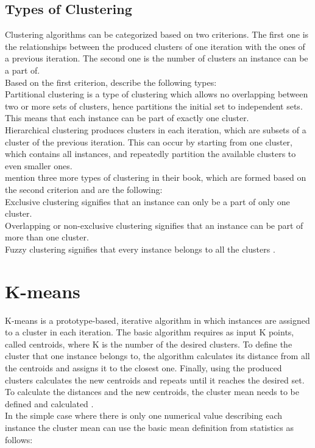 \subsection{Types of Clustering}
Clustering algorithms can be categorized based on two criterions. The first one is the relationships between the produced clusters of one iteration with the ones of a previous iteration. The second one is the number of clusters an instance can be a part of. \\
Based on the first criterion, \textcite{tanSteinKum} describe the following types: \\
Partitional clustering is a type of clustering which allows no overlapping between two or more sets of clusters, hence partitions the initial set to independent sets. This means that each instance can be part of exactly one cluster. \\
Hierarchical clustering produces clusters in each iteration, which are subsets of a cluster of the previous iteration. This can occur by starting from one cluster, which contains all instances, and repeatedly partition the available clusters to even smaller ones. \\
\textcite{tanSteinKum} mention three more types of clustering in their book, which are formed based on the second criterion and are the following: \\
Exclusive clustering signifies that an instance can only be a part of only one cluster. \\
Overlapping or non-exclusive clustering signifies that an instance can be part of more than one cluster. \\
Fuzzy clustering signifies that every instance belongs to all the clusters \autocite{tanSteinKum}.

\section{K-means}
K-means is a prototype-based, iterative algorithm in which instances are assigned to a cluster in each iteration. The basic algorithm requires as input K points, called centroids, where K is the number of the desired clusters. To define the cluster that one instance belongs to, the algorithm calculates its distance from all the centroids and assigns it to the closest one. Finally, using the produced clusters calculates the new centroids and repeats until it reaches the desired set. To calculate the distances and the new centroids, the cluster mean needs to be defined and calculated \autocite{dunham, tanSteinKum}. \\
In the simple case where there is only one numerical value describing each instance the cluster mean can use the basic mean definition from statistics as follows: \\


